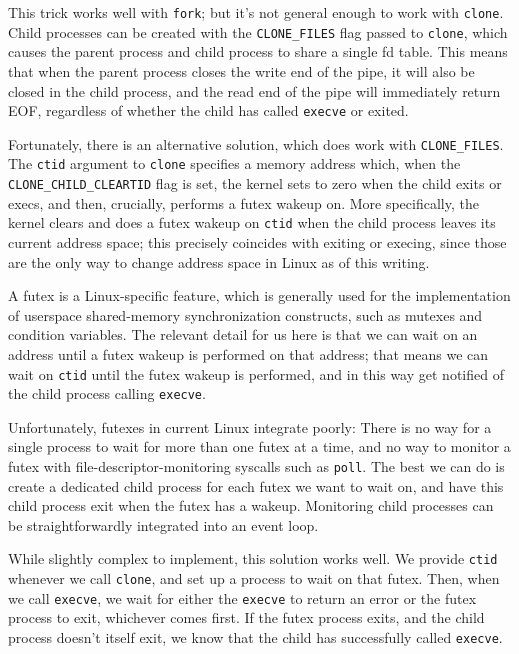 \documentclass{acmart}
\begin{document}
This trick works well with \texttt{fork};
but it's not general enough to work with \texttt{clone}.
Child processes can be created with the \verb|CLONE_FILES| flag passed to \texttt{clone},
which causes the parent process and child process to share a single fd table.
This means that when the parent process closes the write end of the pipe,
it will also be closed in the child process,
and the read end of the pipe will immediately return EOF,
regardless of whether the child has called \texttt{execve} or exited.

Fortunately, there is an alternative solution, which does work with \verb|CLONE_FILES|.
The \texttt{ctid} argument to \texttt{clone} specifies a memory address which,
when the \verb|CLONE_CHILD_CLEARTID| flag is set,
the kernel sets to zero when the child exits or execs,
and then, crucially, performs a futex wakeup on.
More specifically,
the kernel clears and does a futex wakeup on \texttt{ctid} when the child process leaves its current address space;
this precisely coincides with exiting or execing,
since those are the only way to change address space in Linux as of this writing.

A futex is a Linux-specific feature,
which is generally used for the implementation of userspace shared-memory synchronization constructs,
such as mutexes and condition variables.
The relevant detail for us here is that we can wait on an address
until a futex wakeup is performed on that address;
that means we can wait on \texttt{ctid} until the futex wakeup is performed,
and in this way get notified of the child process calling \texttt{execve}.

Unfortunately, futexes in current Linux integrate poorly:
There is no way for a single process to wait for more than one futex at a time,
and no way to monitor a futex with file-descriptor-monitoring syscalls such as \texttt{poll}.
The best we can do is create a dedicated child process for each futex we want to wait on,
and have this child process exit when the futex has a wakeup.
Monitoring child processes can be straightforwardly integrated into an event loop.

While slightly complex to implement, this solution works well.
We provide \texttt{ctid} whenever we call \texttt{clone},
and set up a process to wait on that futex.
Then, when we call \texttt{execve},
we wait for either the \texttt{execve} to return an error or the futex process to exit,
whichever comes first.
If the futex process exits,
and the child process doesn't itself exit,
we know that the child has successfully called \texttt{execve}.
\end{document}

